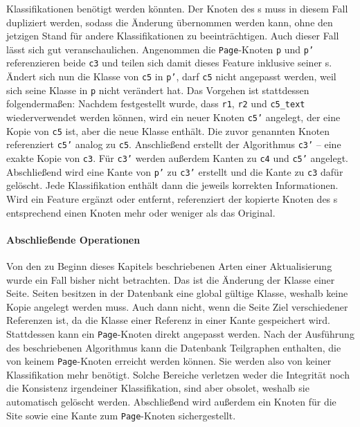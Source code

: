 \begin{enumerate}
        Klassifikationen benötigt werden könnten.
        Der Knoten des {\parentFeature}s muss in diesem Fall dupliziert werden,
        sodass die Änderung übernommen werden kann,
        ohne den jetzigen Stand für andere Klassifikationen zu beeinträchtigen.
        Auch dieser Fall lässt sich gut veranschaulichen.
        Angenommen die \texttt{Page}-Knoten \texttt{p} und \texttt{p'} referenzieren beide \texttt{c3} und teilen sich damit
        dieses Feature inklusive seiner {\childFeature}s.
        Ändert sich nun die Klasse von \texttt{c5} in \texttt{p'},
        darf \texttt{c5} nicht angepasst werden, weil sich seine Klasse in \texttt{p} nicht verändert hat.
        Das Vorgehen ist stattdessen folgendermaßen:
        Nachdem festgestellt wurde, dass \texttt{r1}, \texttt{r2} und \texttt{c5\_text} wiederverwendet werden können,
        wird ein neuer Knoten \texttt{c5'} angelegt, der eine Kopie von \texttt{c5} ist, aber die neue Klasse enthält.
        Die zuvor genannten Knoten referenziert \texttt{c5'} analog zu \texttt{c5}.
        Anschließend erstellt der Algorithmus \texttt{c3'} -- eine exakte Kopie von \texttt{c3}.
        Für \texttt{c3'} werden außerdem Kanten zu \texttt{c4} und \texttt{c5'} angelegt.
        Abschließend wird eine Kante von \texttt{p'} zu \texttt{c3'} erstellt und die Kante zu \texttt{c3} dafür gelöscht.
        Jede Klassifikation enthält dann die jeweils korrekten Informationen.
        Wird ein Feature ergänzt oder entfernt, referenziert der kopierte Knoten des {\parentFeature}s
        entsprechend einen Knoten mehr oder weniger als das Original.
    \end{enumerate}

    \paragraph{Abschließende Operationen}
    Von den zu Beginn dieses Kapitels beschriebenen Arten einer Aktualisierung wurde ein Fall bisher nicht betrachten.
    Das ist die Änderung der Klasse einer Seite.
    Seiten besitzen in der Datenbank eine global gültige Klasse,
    weshalb keine Kopie angelegt werden muss.
    Auch dann nicht, wenn die Seite Ziel verschiedener Referenzen ist,
    da die Klasse einer Referenz in einer Kante gespeichert wird.
    Stattdessen kann ein \texttt{Page}-Knoten direkt angepasst werden.
    Nach der Ausführung des beschriebenen Algorithmus kann die Datenbank
    Teilgraphen enthalten, die von keinem \texttt{Page}-Knoten erreicht werden können.
    Sie werden also von keiner Klassifikation mehr benötigt.
    Solche Bereiche verletzen weder die Integrität noch die Konsistenz irgendeiner Klassifikation,
    sind aber obsolet, weshalb sie automatisch gelöscht werden.
    Abschließend wird außerdem ein Knoten für die Site sowie eine Kante zum \texttt{Page}-Knoten sichergestellt.


